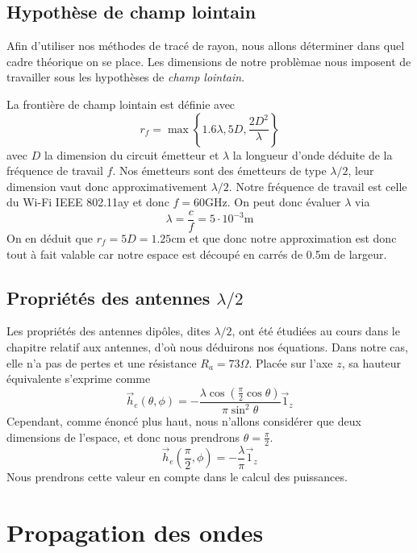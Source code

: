 \subsection{Hypoth{\`e}se de champ lointain}

Afin d'utiliser nos m{\'e}thodes de trac{\'e} de rayon, nous allons
d{\'e}terminer dans quel cadre th{\'e}orique on se place. Les dimensions de
notre probl{\`e}mae nous imposent de travailler sous les hypoth{\`e}ses de
\textit{champ lointain}.

La fronti{\`e}re de champ lointain est d{\'e}finie avec
\[ r_f = \max \left\{ 1.6 \lambda, 5 D, \frac{2 D^2}{\lambda} \right\} \]
avec $D$ la dimension du circuit {\'e}metteur et $\lambda$ la longueur d'onde
d{\'e}duite de la fr{\'e}quence de travail $f$. Nos {\'e}metteurs sont des
{\'e}metteurs de type $\lambda / 2$, leur dimension vaut donc
approximativement $\lambda / 2$. Notre fr{\'e}quence de travail est celle du
Wi-Fi IEEE 802.11ay et donc $f = 60 \mathrm{GHz}$. On peut donc {\'e}valuer $\lambda$
via
\[ \lambda = \frac{c}{f} = 5 \cdot 10^{- 3} \mathrm{m} \]
On en d{\'e}duit que $r_f = 5 D = 1.25 \mathrm{cm}$ et que donc notre
approximation est donc tout {\`a} fait valable car notre espace est
d{\'e}coup{\'e} en carr{\'e}s de 0.5m de largeur.

\subsection{Propri{\'e}t{\'e}s des antennes $\lambda / 2$}

Les propri{\'e}t{\'e}s des antennes dip{\^o}les, dites $\lambda / 2$, ont
{\'e}t{\'e} {\'e}tudi{\'e}es au cours dans le chapitre relatif aux antennes,
d'o{\`u} nous d{\'e}duirons nos {\'e}quations. Dans notre cas, elle n'a pas de
pertes et une r{\'e}sistance $R_a = 73 \Omega$. Plac{\'e}e sur l'axe $z$, sa
hauteur {\'e}quivalente s'exprime comme
\[ \vec{h}_e (\theta, \phi) = - \frac{\lambda \cos \left( \frac{\pi}{2} \cos
   \theta \right)}{\pi \sin^2 \theta} \vec{1}_z \]
Cependant, comme {\'e}nonc{\'e} plus haut, nous n'allons consid{\'e}rer que
deux dimensions de l'espace, et donc nous prendrons $\theta = \frac{\pi}{2}$.
\[ \vec{h}_e \left( \frac{\pi}{2}, \phi \right) = - \frac{\lambda}{\pi}
   \vec{1}_z \]
Nous prendrons cette valeur en compte dans le calcul des puissances.

\section{Propagation des ondes}

